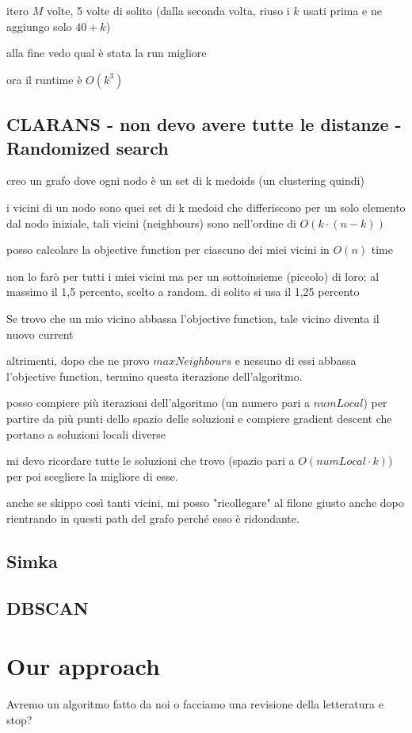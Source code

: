 itero $M$ volte, 5 volte di solito (dalla seconda volta, riuso i $k$ usati prima e ne aggiungo solo $40 + k$)

alla fine vedo qual è stata la run migliore

ora il runtime è $O(k^3)$
\subsection{CLARANS - non devo avere tutte le distanze - Randomized search}
creo un grafo dove ogni nodo è un set di k medoids (un clustering quindi)

i vicini di un nodo sono quei set di k medoid che differiscono per un solo elemento dal nodo iniziale, tali vicini (neighbours) sono nell'ordine di $O(k \cdot (n-k))$

posso calcolare la objective function per ciascuno dei miei vicini in $O(n)$ time

non lo farò per tutti i miei vicini ma per un sottoinsieme (piccolo) di loro: al massimo il  1,5 percento, scelto a random. di solito si usa il 1,25 percento

Se trovo che un mio vicino abbassa l'objective function, tale vicino diventa il nuovo current

altrimenti, dopo che ne provo $maxNeighbours$ e nessuno di essi abbassa l'objective function, termino questa iterazione dell'algoritmo.

posso compiere più iterazioni dell'algoritmo (un numero pari a $numLocal$) per partire da più punti dello spazio delle soluzioni e compiere gradient descent che portano a soluzioni locali diverse

mi devo ricordare tutte le soluzioni che trovo (spazio pari a $O(numLocal \cdot k)$) per poi scegliere la migliore di esse.

anche se skippo così tanti vicini, mi posso "ricollegare" al filone giusto anche dopo rientrando in questi path del grafo perché esso è ridondante.
\subsection{Simka}
\subsection{DBSCAN}
\section{Our approach}
Avremo un algoritmo fatto da noi o facciamo una revisione della letteratura e stop?

